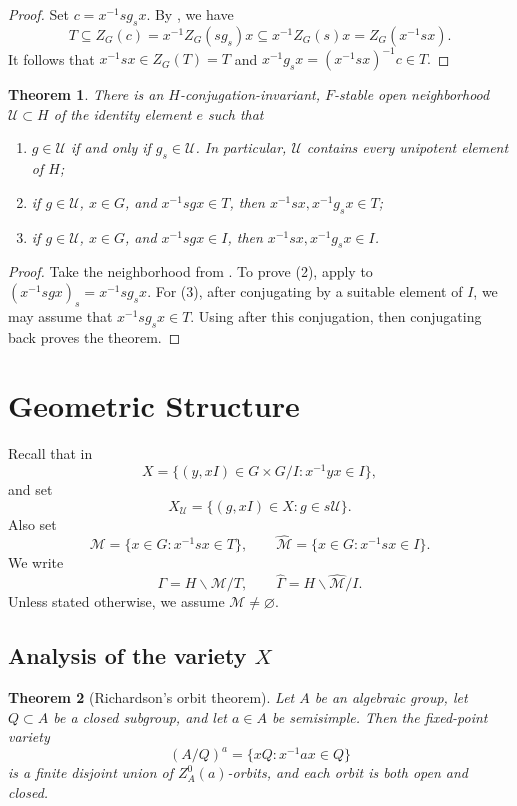 \documentclass[11pt,letterpaper]{amsart}
\newtheorem{theorem}{Theorem}
\theoremstyle{definition}
\numberwithin{equation}{section}
\numberwithin{theorem}{section}
\begin{document}
\begin{proof}
Set $c=x^{-1}s g_s x$. By , we have
\[
T\subseteq Z_{G}(c)
=x^{-1}Z_{G}(sg_s)x
\subseteq x^{-1}Z_{G}(s)x
=Z_{G}(x^{-1}s x).
\]
It follows that $x^{-1}s x\in Z_{G}(T)=T$ and
\(
x^{-1}g_sx=(x^{-1}s x)^{-1}c\in T.
\)
\end{proof}

\begin{theorem}
\label{sep}
There is an \(H\)-conjugation-invariant, \(F\)-stable open neighborhood
\(\mathcal U\subset H\) of the identity element \(e\) such that
\begin{enumerate}
\item \(g\in\mathcal U\) if and only if \(g_s\in\mathcal U\). In particular, $\mathcal U$ contains every unipotent element of $H$;
\item if \(g\in\mathcal U\), \(x\in G\), and \(x^{-1}sgx\in T\), then
      \(x^{-1}sx,x^{-1}g_sx\in T\);
\item if \(g\in\mathcal U\), \(x\in G\), and \(x^{-1}sgx\in I\), then
      \(x^{-1}sx,x^{-1}g_sx\in I\).
\end{enumerate}
\end{theorem}
\begin{proof}
Take the neighborhood from .  To prove
(2), apply  to
$(x^{-1}sgx)_s=x^{-1}sg_sx$.  For (3), after conjugating by a suitable
element of $I$, we may assume that $x^{-1}sg_sx\in T$. Using
 after this conjugation, then conjugating
back proves the theorem.
\end{proof}

\section{Geometric Structure}
\label{geom}
Recall that in 
\[
 X=\{(y,xI)\in G\times G/I:x^{-1}yx\in I\},
\]
and set
\[X_{\mathcal U}=\{(g,xI)\in X:g\in s\mathcal U\}.\]
Also set
\[
 \mathcal M=\{x\in G:x^{-1}sx\in T\},\qquad
 \widehat{\mathcal M}=\{x\in G:x^{-1}sx\in I\}.
\]
We write
\[
 \Gamma=H\backslash\mathcal M/T,
 \qquad
 \widehat\Gamma=H\backslash\widehat{\mathcal M}/I.
\]
Unless stated otherwise, we assume \(\mathcal M\ne\varnothing\).

\subsection{Analysis of the variety $X$}

\begin{theorem}[Richardson's orbit theorem]\label{Rich}
Let \(A\) be an algebraic group, let \(Q\subset A\) be a
closed subgroup, and let \(a\in A\) be semisimple. Then the fixed-point variety
\[
(A/Q)^a=\{xQ:x^{-1}ax\in Q\}
\]
is a finite disjoint union of $Z^0_{A}(a)$-orbits, and each orbit is
both open and closed.
\end{theorem}
\end{document}
